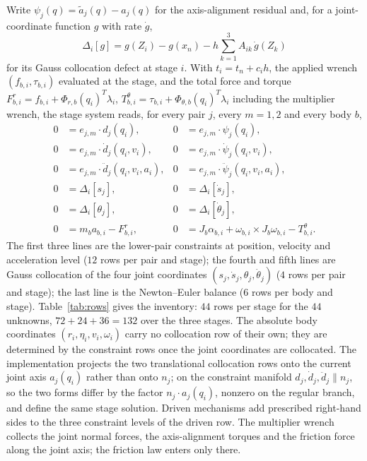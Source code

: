 Write $\psi_j(q)=\tilde a_j(q)-a_j(q)$ for the axis-alignment residual and, for a joint-coordinate
function $g$ with rate $\dot g$,
\begin{equation}
  \Delta_i[g]=g(Z_i)-g(x_n)-h\sum_{k=1}^3A_{ik}\,\dot g(Z_k)
  \label{eq:collocation-defect-operator}
\end{equation}
for its Gauss collocation defect at stage $i$. With $t_i=t_n+c_ih$, the applied wrench
$(f_{b,i},\tau_{b,i})$ evaluated at the stage, and the total force and torque
$F^r_{b,i}=f_{b,i}+\Phi_{r,b}(q_i)^T\lambda_i$, $T^\theta_{b,i}=\tau_{b,i}+\Phi_{\theta,b}(q_i)^T\lambda_i$
including the multiplier wrench, the stage system reads, for every pair $j$, every $m=1,2$ and
every body $b$,
\begin{equation}
\label{eq:g6fullva-expanded-stage}
\begin{aligned}
0 &= e_{j,m}\cdot d_j(q_i), &
0 &= e_{j,m}\cdot\psi_j(q_i),\\
0 &= e_{j,m}\cdot\dot d_j(q_i,v_i), &
0 &= e_{j,m}\cdot\dot\psi_j(q_i,v_i),\\
0 &= e_{j,m}\cdot\ddot d_j(q_i,v_i,a_i), &
0 &= e_{j,m}\cdot\ddot\psi_j(q_i,v_i,a_i),\\
0 &= \Delta_i[s_j], & 0 &= \Delta_i[\dot s_j],\\
0 &= \Delta_i[\theta_j], & 0 &= \Delta_i[\dot\theta_j],\\
0 &= m_b a_{b,i}-F^r_{b,i}, &
0 &= J_b\alpha_{b,i}+\omega_{b,i}\times J_b\omega_{b,i}-T^\theta_{b,i} .
\end{aligned}
\end{equation}
The first three lines are the lower-pair constraints at position, velocity and acceleration level
($12$ rows per pair and stage); the fourth and fifth lines are Gauss collocation of the four joint
coordinates $(s_j,\dot s_j,\theta_j,\dot\theta_j)$ ($4$ rows per pair and stage); the last line is
the Newton--Euler balance ($6$ rows per body and stage). Table~\ref{tab:rows} gives the inventory:
$44$ rows per stage for the $44$ unknowns, $72+24+36=132$ over the three stages. The absolute body
coordinates $(r_i,\eta_i,v_i,\omega_i)$ carry no collocation row of their own; they are determined
by the constraint rows once the joint coordinates are collocated. The implementation projects the
two translational collocation rows onto the current joint axis $a_j(q_i)$ rather than onto $n_j$;
on the constraint manifold $d_j,\dot d_j,\ddot d_j\parallel n_j$, so the two forms differ by the
factor $n_j\cdot a_j(q_i)$, nonzero on the regular branch, and define the same stage solution.
Driven mechanisms add prescribed right-hand sides to the three constraint levels of the driven
row. The multiplier wrench collects the joint normal forces, the axis-alignment torques and the
friction force along the joint axis; the friction law enters only there.

